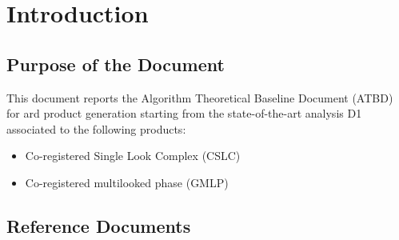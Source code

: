 \section{Introduction}

\subsection{Purpose of the Document}
This document reports the Algorithm Theoretical Baseline Document (ATBD) for \acs{ard} product generation starting from the state-of-the-art analysis D1~\cite{D1} associated to the following products: 

	\begin{itemize}
		\item Co-registered Single Look Complex (CSLC)
		\item Co-registered multilooked phase (GMLP)
	\end{itemize}
	
\subsection{Reference Documents}

\renewcommand{\refname}{}
\vspace{-2em}



\clearpage
